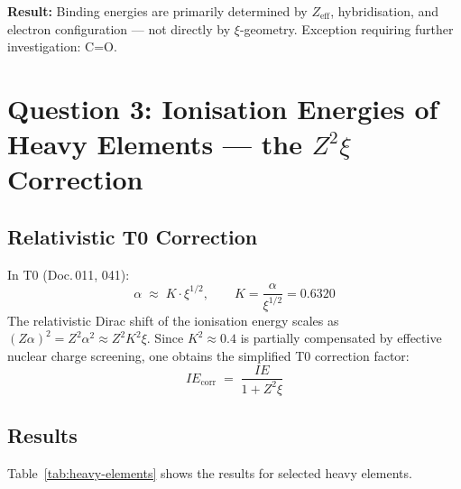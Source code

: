 \textbf{Result:} Binding energies are primarily determined by $Z_\mathrm{eff}$,
hybridisation, and electron configuration — not directly by $\xi$-geometry.
Exception requiring further investigation: C=O.

\section{Question 3: Ionisation Energies of Heavy Elements — the \texorpdfstring{$Z^2\xi$}{Z²ξ} Correction}
\label{sec:heavy-elements}

\subsection{Relativistic T0 Correction}
\label{subsec:rel-correction}

In T0 (Doc.\,011, 041):
\begin{equation}
  \alpha \;\approx\; K \cdot \xi^{1/2}, \qquad K = \frac{\alpha}{\xi^{1/2}} = 0.6320
\end{equation}
The relativistic Dirac shift of the ionisation energy scales as
$(Z\alpha)^2 = Z^2 \alpha^2 \approx Z^2 K^2 \xi$.
Since $K^2 \approx 0.4$ is partially compensated by effective nuclear charge
screening, one obtains the simplified T0 correction factor:
\begin{equation}
  \boxed{IE_\mathrm{corr} \;=\; \frac{IE}{1 + Z^2 \xi}}
  \label{eq:IE-corr}
\end{equation}

\subsection{Results}
\label{subsec:results-heavy}

Table~\ref{tab:heavy-elements} shows the results for selected heavy elements.

\begin{table}[htbp]
\centering
\caption{T0 correction of ionisation energies for $Z > 54$}
\label{tab:heavy-elements}
\end{table}

